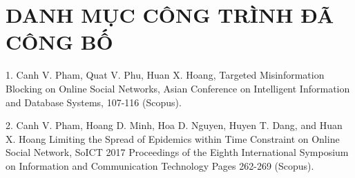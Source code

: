 \chapter*{DANH MỤC CÔNG TRÌNH ĐÃ CÔNG BỐ}


1.  Canh V. Pham, Quat V. Phu, Huan X. Hoang, Targeted Misinformation Blocking on Online Social Networks, Asian Conference on Intelligent Information and Database Systems, 107-116 (Scopus).
	
2.  Canh V. Pham, Hoang D. Minh, Hoa D. Nguyen, Huyen T. Dang, and Huan X. Hoang Limiting the Spread of Epidemics within Time Constraint on Online Social Network, SoICT 2017 Proceedings of the Eighth International Symposium on Information and Communication Technology Pages 262-269 (Scopus).
	